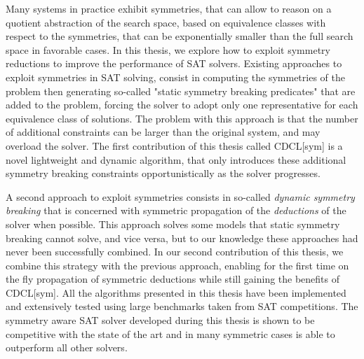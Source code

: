 Many systems in practice exhibit symmetries, that can allow to reason on a quotient abstraction of the 
search space, based on equivalence classes with respect to the symmetries, that can be exponentially smaller than the full search space in favorable cases.
In this thesis, we explore how to exploit symmetry reductions to improve the performance of SAT solvers.
Existing approaches to exploit symmetries in SAT solving, consist in computing the symmetries of the problem 
then generating so-called "static symmetry breaking predicates" that are added to the problem, forcing the solver to 
adopt only one representative for each equivalence class of solutions.
The problem with this approach is that the number of additional constraints can be larger than the original system,
 and may overload the solver. The first contribution of this thesis called CDCL[sym] is a novel lightweight and dynamic algorithm,  that only introduces these additional symmetry breaking constraints opportunistically as the solver progresses.
 
A second approach to exploit symmetries consists in so-called \textit{dynamic symmetry breaking} that
is concerned with symmetric propagation of the \textit{deductions} of the solver when possible.
This approach solves some models that static symmetry breaking cannot solve, and vice versa,
but to our knowledge these approaches had never been successfully combined. 
In our second contribution of this thesis, we combine this strategy with the previous
approach,  enabling for the first time on the fly propagation of symmetric deductions 
 while still gaining the benefits of CDCL[sym].
All the algorithms presented in this thesis have been implemented and extensively tested using large benchmarks taken from SAT competitions. The symmetry aware SAT solver developed during this thesis is shown to be competitive with the state of the art
and in many symmetric cases is able to outperform all other solvers.

